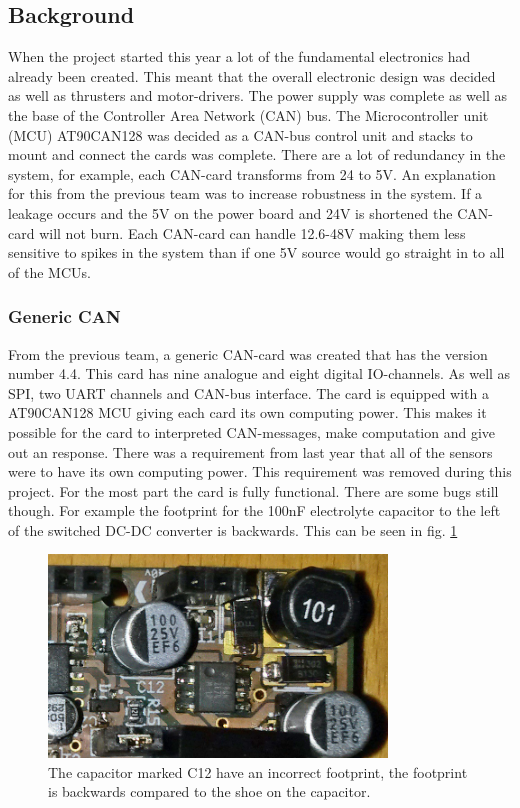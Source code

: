 \subsection{Background} 
  When the project started this year a lot of the fundamental electronics had already been created. This meant that the overall electronic design was decided as well as thrusters and motor-drivers. The power supply was complete as well as the base of the Controller Area Network (CAN) bus. The Microcontroller unit (MCU) AT90CAN128 was decided as a CAN-bus control unit and stacks to mount and connect the cards was complete. There are a lot of redundancy in the system, for example, each CAN-card transforms from 24 to 5V. An explanation for this from the previous team was to increase robustness in the system. If a leakage occurs and the 5V on the power board and 24V is shortened the CAN-card will not burn. Each CAN-card can handle 12.6-48V making them less sensitive to spikes in the system than if one 5V source would go straight in to all of the MCUs.
  
  	\subsubsection{Generic CAN} %
From the previous team, a generic CAN-card was created that has the version number 4.4. This card has nine analogue and eight digital IO-channels. As well as SPI, two UART channels and CAN-bus interface. The card is equipped with a AT90CAN128 MCU giving each card its own computing power. This makes it possible for the card to interpreted CAN-messages, make computation and give out an response. There was a requirement from last year that all of the sensors were to have its own computing power. This requirement was removed during this project. For the most part the card is fully functional. There are some bugs still though. For example the footprint for the 100nF electrolyte capacitor to the left of the switched DC-DC converter is backwards. This can be seen in fig. \ref{Capacitor}

\begin{figure}[!ht]
	\begin{center}
		\includegraphics[width=90mm]{./images/Electronics/Capasitor.jpg}
		\caption{The capacitor marked C12 have an incorrect footprint, the footprint is backwards compared to the shoe on the capacitor.}
		\label{Capacitor}
	\end{center}
\end{figure}
   

